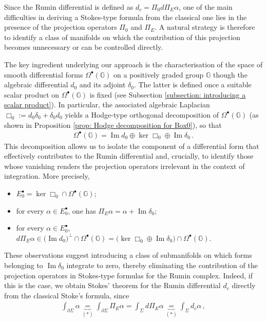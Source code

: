 \documentclass[dvipsnames]{amsart}
\theoremstyle{definition}
\theoremstyle{definition}
\numberwithin{equation}{section}
\newcommand{\G}{\mathbb{G}}
\begin{document}
Since the Rumin differential is defined as $d_c=\Pi_0d\Pi_E\alpha$, one of the main difficulties in deriving a Stokes-type formula from the classical one lies in the presence of the projection operators $\Pi_0$ and $\Pi_E$. A natural strategy is therefore to identify a class of manifolds on which the contribution of this projection becomes unnecessary or can be controlled directly.

The key ingredient underlying our approach is the characterisation of the space of smooth differential forms $\Omega^\bullet(\G)$ on a positively graded group $\G$ though the algebraic differential $d_0$ and its adjoint $\delta_0$. The latter is defined once a suitable scalar product on $\Omega^\bullet(\G)$ is fixed (see Subsection \ref{subsection: introducing a scalar product}). In particular, the associated algebraic Laplacian $\Box_0:=d_0\delta_0+\delta_0d_0$ yields a Hodge-type orthogonal decomposition of $\Omega^\bullet(\G)$ (as shown in Proposition \ref{prop: Hodge decomposition for Box0}), so that
\begin{align*}
    \Omega^\bullet(\G)=\operatorname{Im}d_0\oplus\ker\Box_0\oplus\operatorname{Im}\delta_0\,.
\end{align*}
This decomposition allows us to isolate the component of a differential form that effectively contributes to the Rumin differential and, crucially, to identify those whose vanishing renders the projection operators irrelevant in the context of integration. More precisely,
\begin{itemize}
    \item \(E_0^\bullet=\ker\Box_0\cap\Omega^\bullet(\G)\);
    \item for every \(\alpha\in E_0^\bullet\), one has $\Pi_E\alpha=\alpha+\operatorname{Im}\delta_0$;
    \item for every \(\alpha\in E_0^\bullet\), $d\Pi_E\alpha
        \in
        \big(\operatorname{Im}d_0\big)^\perp\cap\Omega^\bullet(\G)
        =
        \big(\ker\Box_0\oplus\operatorname{Im}\delta_0\big)\cap\Omega^\bullet(\G)$.
\end{itemize}
These observations suggest introducing a class of submanifolds on which forms belonging to \(\operatorname{Im}\delta_0\) integrate to zero, thereby eliminating the contribution of the projection operators in Stokes-type formulas for the Rumin complex.
Indeed, if this is the case, we obtain Stokes' theorem for the Rumin differential $d_c$ directly from the classical Stoke's formula, since 
\begin{align*}
        \int_{\partial\Sigma}\alpha\underbrace{=}_{(\ast)}\int_{\partial\Sigma}\Pi_E\alpha=\int_{\Sigma}d\Pi_E\alpha\underbrace{=}_{(\ast)}\int_{\Sigma}d_c\alpha\,,
    \end{align*}
\end{document}
